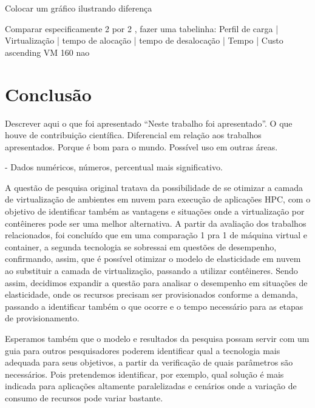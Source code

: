 \documentclass[twoside,english,brazilian]{UNISINOSartigo}
\begin{document}
Colocar um gráfico ilustrando diferença

Comparar especificamente 2 por 2 , fazer uma tabelinha:
Perfil de carga | Virtualização | tempo de alocação | tempo de desalocação | Tempo | Custo
ascending            VM              160                  nao                 


\section{Conclusão}
\label{conclusion}

Descrever aqui o que foi apresentado ``Neste trabalho foi apresentado''. O que houve de contribuição científica.
Diferencial em relação aos trabalhos apresentados. Porque é bom para o mundo.
Possível uso em outras áreas.

- Dados numéricos, números, percentual mais significativo.

A questão de pesquisa original tratava da possibilidade de se otimizar a camada de virtualização de ambientes em nuvem para execução de aplicações HPC, com o objetivo de identificar também as vantagens e situações onde a virtualização por contêineres pode ser uma melhor alternativa. A partir da avaliação dos trabalhos relacionados, foi concluído que em uma comparação 1 pra 1 de máquina virtual e container, a segunda tecnologia se sobressai em questões de desempenho, confirmando, assim, que é possível otimizar o modelo de elasticidade em nuvem ao substituir a camada de virtualização, passando a utilizar contêineres. Sendo assim, decidimos expandir a questão para analisar o desempenho em situações de elasticidade, onde os recursos precisam ser provisionados conforme a demanda, passando a identificar também o que ocorre e o tempo necessário para as etapas de provisionamento. 

Esperamos também que o modelo e resultados da pesquisa possam servir com um guia para outros pesquisadores poderem identificar qual a tecnologia mais adequada para seus objetivos, a partir da verificação de quais parâmetros são necessários. Pois pretendemos identificar, por exemplo, qual solução é mais indicada para aplicações altamente paralelizadas e cenários onde a variação de consumo de recursos pode variar bastante.
\end{document}
